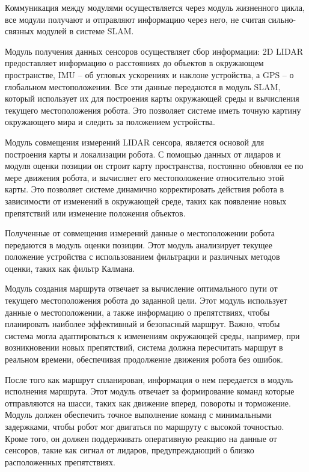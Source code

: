Коммуникация между модулями осуществляется через модуль жизненного цикла, все
модули получают и отправляют информацию через него, не считая сильно-связных
модулей в системе SLAM. 

Модуль получения данных сенсоров осуществляет сбор информации: 2D LIDAR
предоставляет информацию о расстояниях до объектов в окружающем пространстве,
IMU -- об угловых ускорениях и наклоне устройства, а GPS -- о
глобальном местоположении. Все эти данные передаются в модуль SLAM, который
использует их для построения карты окружающей среды и вычисления текущего
местоположения робота. Это позволяет системе иметь точную картину окружающего
мира и следить за положением устройства.

Модуль совмещения измерений LIDAR сенсора, является основой для построения карты
и локализации робота. С помощью данных от лидаров и модуля оценки позиции он
строит карту пространства, постоянно обновляя ее по мере движения робота, и
вычисляет его местоположение относительно этой карты. Это позволяет системе
динамично корректировать действия робота в зависимости от изменений в окружающей
среде, таких как появление новых препятствий или изменение положения объектов.

Полученные от совмещения измерений данные о местоположении робота передаются в модуль оценки
позиции. Этот модуль анализирует текущее положение устройства с использованием
фильтрации и различных методов оценки, таких как фильтр Калмана.

Модуль создания маршрута отвечает за вычисление оптимального пути от текущего
местоположения робота до заданной цели. Этот модуль использует данные о
местоположении, а также информацию о препятствиях, чтобы планировать наиболее
эффективный и безопасный маршрут. Важно, чтобы система могла адаптироваться к
изменениям окружающей среды, например, при возникновении новых препятствий,
система должна пересчитать маршрут в реальном времени, обеспечивая продолжение
движения робота без ошибок.

После того как маршрут спланирован, информация о нем передается в модуль
исполнения маршрута. Этот модуль отвечает за формирование команд которые
отправляются на шасси, таких как движение вперед, повороты и торможение. Модуль
должен обеспечить точное выполнение команд с минимальными задержками, чтобы
робот мог двигаться по маршруту с высокой точностью. Кроме того, он должен
поддерживать оперативную реакцию на данные от сенсоров, такие как сигнал от
лидаров, предупреждающий о близко расположенных препятствиях.

